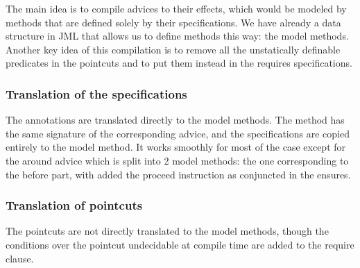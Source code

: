 The main idea is to compile advices to their effects, which would be modeled by methods that are defined
solely by their specifications. We have already a data structure in JML that allows us to define methods
this way: the model methods. Another key idea of this compilation is to remove all the unstatically definable
predicates in the pointcuts and to put them instead in the requires specifications.

\subsubsection{Translation of the specifications}
The annotations are translated directly to the model methods. The method has the same signature
 of the corresponding advice, and the specifications are copied entirely to the model method. It works smoothly
for most of the case except for the around advice which is split into 2 model methods: the one corresponding
to the before part, with added the proceed instruction as conjuncted in the ensures.
\subsubsection{Translation of pointcuts}
The pointcuts are not directly translated to the model methods, though the conditions over the pointcut undecidable
at compile time are added to the require clause.

